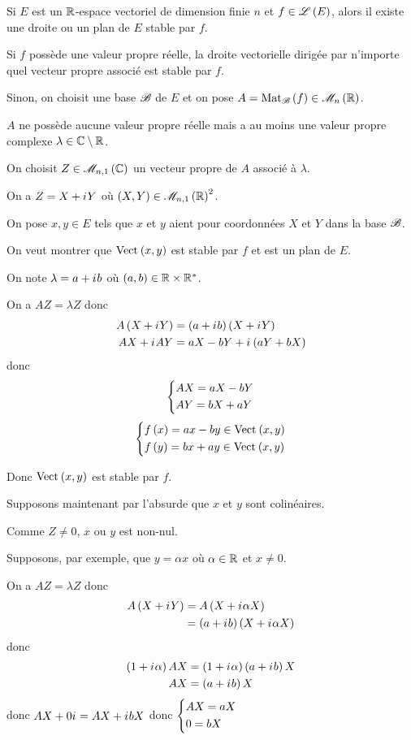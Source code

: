 \begin{lem}
Si \(E\) est un \(\mathbb{R}\)-espace vectoriel de dimension finie \(n\) et \(f\in\mathscr{L}\left(E\right)\), alors il existe une droite ou un plan de \(E\) stable par \(f\).
\end{lem}

\begin{dem}
Si \(f\) possède une valeur propre réelle, la droite vectorielle dirigée par n'importe quel vecteur propre associé est stable par \(f\).

Sinon, on choisit une base \(\mathscr{B}\) de \(E\) et on pose \(A=\Mat{f}\in\M{n}[\R]\).

\(A\) ne possède aucune valeur propre réelle mais a au moins une valeur propre complexe \(\lambda\in\mathbb{C}\setminus\mathbb{R}\).

On choisit \(Z\in\M{n,1}[\C]\) un vecteur propre de \(A\) associé à \(\lambda\).

On a \(Z=X+i\mkern1mu Y\) où \(\paren{X,Y}\in\M{n,1}[\R]^2\).

On pose \(x,y\in E\) tels que \(x\) et \(y\) aient pour coordonnées \(X\) et \(Y\) dans la base \(\mathscr{B}\).

On veut montrer que \(\Vect{x,y}\) est stable par \(f\) et est un plan de \(E\).

On note \(\lambda=a+i\mkern1mu b\) où \(\left(a,b\right)\in\mathbb{R}\times\mathbb{R}^*\).

On a \(AZ=\lambda Z\) donc \[\begin{aligned}
A\left(X+i\mkern1mu Y\right)&=\left(a +i\mkern1mu b\right)\left(X+i\mkern1mu Y\right) \\
AX+i\mkern1mu AY&=aX-bY+i\mkern1mu\left(aY+bX\right)
\end{aligned}\] donc \[\begin{dcases}
AX=aX-bY \\
AY=bX+aY
\end{dcases}\] \ie \[\begin{dcases}
f\paren{x}=ax-by\in\Vect{x,y} \\
f\paren{y}=bx+ay\in\Vect{x,y}
\end{dcases}\]

Donc \(\Vect{x,y}\) est stable par \(f\).

Supposons maintenant par l'absurde que \(x\) et \(y\) sont colinéaires.

Comme \(Z\not=0\), \(x\) ou \(y\) est non-nul.

Supposons, par exemple, que \(y=\alpha x\) où \(\alpha\in\mathbb{R}\) et \(x\not=0\).

On a \(AZ=\lambda Z\) donc \[\begin{aligned}
A\left(X+i\mkern1mu Y\right)&=A\left(X+i\mkern1mu\alpha X\right) \\
&=\left(a+i\mkern1mu b\right)\left(X+i\mkern1mu\alpha X\right)
\end{aligned}\] donc \[\begin{aligned}
\left(1+i\mkern1mu\alpha\right)AX&=\left(1+i\mkern1mu\alpha\right)\left(a+i\mkern1mu b\right)X \\
AX&=\left(a+i\mkern1mu b\right)X
\end{aligned}\] donc \(AX+0i\mkern1mu=AX+i\mkern1mu bX\) donc \(\begin{dcases}
AX=aX \\
0=bX
\end{dcases}\)


\end{dem}
